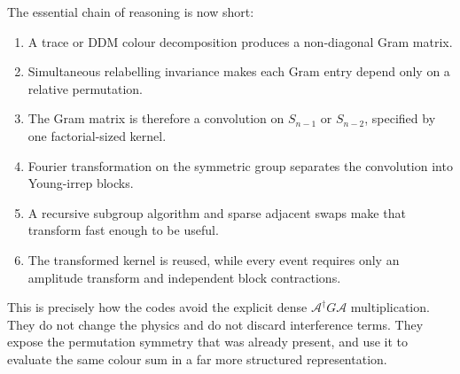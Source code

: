 \documentclass[11pt,a4paper]{article}
\newcommand{\cA}{\mathcal{A}}
\begin{document}
The essential chain of reasoning is now short:
\begin{enumerate}
  \item A trace or DDM colour decomposition produces a non-diagonal Gram
        matrix.
  \item Simultaneous relabelling invariance makes each Gram entry depend only
        on a relative permutation.
  \item The Gram matrix is therefore a convolution on $S_{n-1}$ or
        $S_{n-2}$, specified by one factorial-sized kernel.
  \item Fourier transformation on the symmetric group separates the
        convolution into Young-irrep blocks.
  \item A recursive subgroup algorithm and sparse adjacent swaps make that
        transform fast enough to be useful.
  \item The transformed kernel is reused, while every event requires only an
        amplitude transform and independent block contractions.
\end{enumerate}

This is precisely how the codes avoid the explicit dense
$\cA^\dagger G\cA$ multiplication.  They do not change the physics and do
not discard interference terms.  They expose the permutation symmetry that
was already present, and use it to evaluate the same colour sum in a far more
structured representation.
\end{document}

